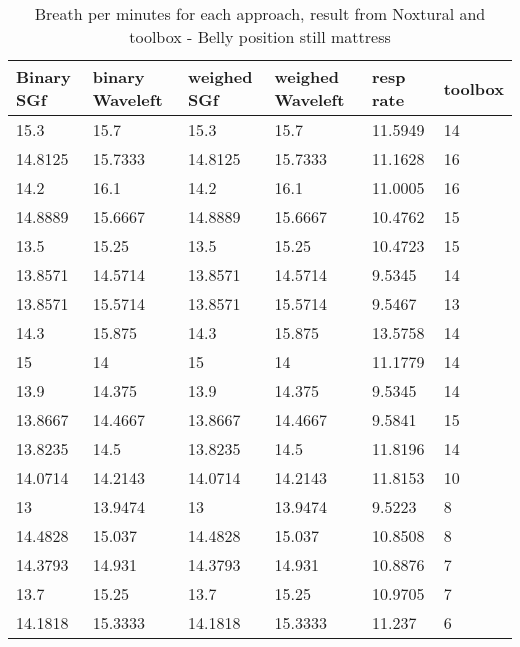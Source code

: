 \begin{table}
\begin{tabular}{|llllll|}
\hline 
Binary SGf & binary Waveleft & weighed  SGf & weighed Waveleft & resp rate & toolbox \\ 
\hline 
15.3 & 15.7 & 15.3 & 15.7 & 11.5949 & 14 \\ 
14.8125 & 15.7333 & 14.8125 & 15.7333 & 11.1628 & 16 \\ 
14.2 & 16.1 & 14.2 & 16.1 & 11.0005 & 16 \\ 
14.8889 & 15.6667 & 14.8889 & 15.6667 & 10.4762 & 15 \\ 
13.5 & 15.25 & 13.5 & 15.25 & 10.4723 & 15 \\ 
13.8571 & 14.5714 & 13.8571 & 14.5714 & 9.5345 & 14 \\ 
13.8571 & 15.5714 & 13.8571 & 15.5714 & 9.5467 & 13 \\ 
14.3 & 15.875 & 14.3 & 15.875 & 13.5758 & 14 \\ 
15 & 14 & 15 & 14 & 11.1779 & 14 \\ 
13.9 & 14.375 & 13.9 & 14.375 & 9.5345 & 14 \\ 
13.8667 & 14.4667 & 13.8667 & 14.4667 & 9.5841 & 15 \\ 
13.8235 & 14.5 & 13.8235 & 14.5 & 11.8196 & 14 \\ 
14.0714 & 14.2143 & 14.0714 & 14.2143 & 11.8153 & 10 \\ 
13 & 13.9474 & 13 & 13.9474 & 9.5223 & 8 \\ 
14.4828 & 15.037 & 14.4828 & 15.037 & 10.8508 & 8 \\ 
14.3793 & 14.931 & 14.3793 & 14.931 & 10.8876 & 7 \\ 
13.7 & 15.25 & 13.7 & 15.25 & 10.9705 & 7 \\ 
14.1818 & 15.3333 & 14.1818 & 15.3333 & 11.237 & 6 \\ 
\hline 
\end{tabular}

\caption{Breath per minutes for each approach, result from Noxtural and toolbox
- Belly position still mattress}
\end{table}


